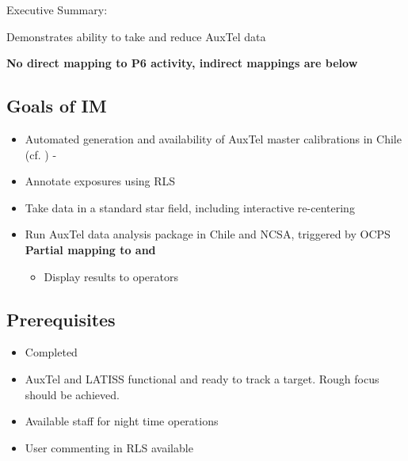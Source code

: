 
Executive Summary:

Demonstrates ability to take and reduce AuxTel data

\textbf{No direct mapping to P6 activity, indirect mappings are below}

\subsection{Goals of IM}
\begin{itemize}
\item Automated generation and availability of AuxTel master calibrations in Chile (cf. ) - \textbf{}
\item Annotate exposures using \gls{RLS}
\item Take data in a standard star field, including interactive re-centering \textbf{}
\item Run AuxTel data analysis package in Chile and NCSA, triggered by \gls{OCPS} \textbf{Partial mapping to  and }
\begin{itemize}
\item Display results to operators %
\end{itemize}
\end{itemize}

\subsection{Prerequisites}
\begin{itemize}
	\item{ Completed}
	\item{AuxTel and LATISS functional and ready to track a target. Rough focus should be achieved.}
	\item{Available staff for night time operations}
	\item{User commenting in \gls{RLS} available}
\end{itemize}

